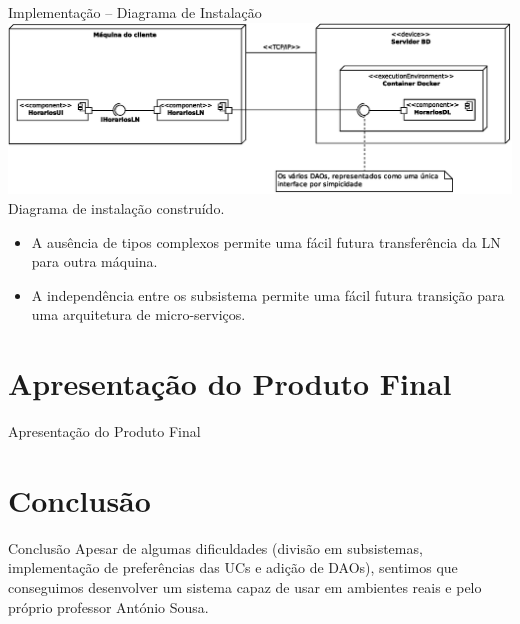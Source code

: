 \documentclass[13pt, handout]{beamer}
\begin{document}
\begin{frame}{Implementação -- Diagrama de Instalação}
    \centering
    \includegraphics[width=\textwidth]{Imagens/Modelos/Instalação.svg.eps} \\
    {\scriptsize Diagrama de instalação construído.}

    \vspace{0.5cm}
    \begin{itemize}
        \justifying
        \item A ausência de tipos complexos permite uma fácil futura transferência da LN para outra
            máquina.
        \item A independência entre os subsistema permite uma fácil futura transição para uma
            arquitetura de micro-serviços.
    \end{itemize}
\end{frame}

\section{Apresentação do Produto Final}

\begin{frame}{Apresentação do Produto Final}
\end{frame}

\section{Conclusão}

\begin{frame}{Conclusão}
    Apesar de algumas dificuldades (divisão em subsistemas, implementação de preferências das UCs e
    adição de DAOs), sentimos que conseguimos desenvolver um sistema capaz de usar em ambientes
    reais e pelo próprio professor António Sousa.
\end{frame}

\frame{\titlepage}
\end{document}
